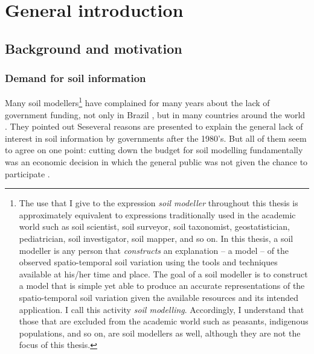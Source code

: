 \setcounter{page}{1}
\artigofalse
\chapter{General introduction}
\label{chap:introduction}


\section{Background and motivation}

\subsection{Demand for soil information}
\label{sec:intro-demand}

Many soil modellers\footnote{The use that I give to the expression \emph{soil modeller} throughout this thesis 
is approximately equivalent to expressions traditionally used in the academic world such as soil scientist, 
soil surveyor, soil taxonomist, geostatistician, pediatrician, soil investigator, soil mapper, and so on. In 
this thesis, a soil modeller is any person that \emph{constructs} an explanation -- a model -- of the observed 
spatio-temporal soil variation using the tools and techniques available at his/her time and place. The goal of 
a soil modeller is to construct a model that is simple yet able to produce an accurate representations of the 
spatio-temporal soil variation given the available resources and its intended application. I call this activity 
\emph{soil modelling}. Accordingly, I understand that those that are excluded from the academic world such as 
peasants, indigenous populations, and so on, are soil modellers as well, although they are not the focus of 
this thesis.} have complained for many years about the lack of government funding, not only in Brazil 
\cite{Dalmolin1999, Ker1999, KerEtAl2003, Mendonca-SantosEtAl2003, Ramos2003, Espindola2008}, but in many 
countries around the world \cite{Basher1997, HarteminkEtAl2008, Grunwald2009, SanchezEtAl2009, Finke2012}. They 
pointed out Seseveral reasons are presented to explain the general lack of interest in soil information by 
governments after the 1980's. But all of them seem to agree on one point: cutting down the budget for soil 
modelling fundamentally was an economic decision in which the general public was not given the chance to 
participate \cite{SamuelRosa2012}.

